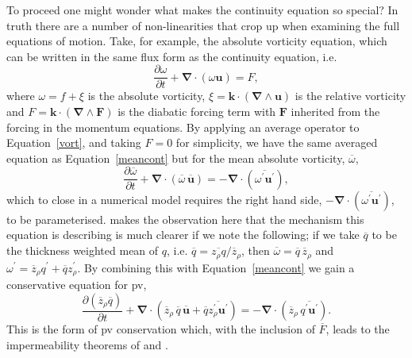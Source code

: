 \documentclass[12pt,a4paper]{report}
\newcommand*\mean[1]{\overline{#1}}
\newcommand*\res[1]{{#1}^{\prime}}
\newcommand*\equref[1]{Equation~\eqref{#1}}
\begin{document}
         To proceed one might wonder what makes the continuity equation
         so special? In truth there are a number of non-linearities that
         crop up when examining the full equations of motion. Take, for example, the
         absolute vorticity equation, which can be written in the same flux form as the continuity equation, i.e.
           \begin{equation}
           \frac{\partial \omega}{\partial t} + \boldsymbol{\nabla}\cdot\left(\omega\boldsymbol{u}\right) = F,
           \label{vort}
           \end{equation}
           where $\omega=f+\xi$ is the absolute vorticity,
           $\xi = \boldsymbol{k} \cdot\left( \boldsymbol{\nabla}\wedge \boldsymbol{u}\right)$ is the relative vorticity
           and $F =\boldsymbol{k} \cdot\left( \boldsymbol{\nabla}\wedge \boldsymbol{F}\right)$ is the diabatic forcing term with 
           $\boldsymbol{F}$ inherited
           from the forcing in the momentum equations. 
           By applying an average operator to \equref{vort}, and taking $F=0$ for
            simplicity, we have the same averaged equation as \equref{meancont} but for the
             mean absolute vorticity, $\mean{\omega}$,
                \begin{equation}
                \frac{\partial \mean{\omega}}{\partial t} + \boldsymbol{\nabla}\cdot\left(\mean{\omega} \, \mean{\boldsymbol{u}}\right) = - \boldsymbol{\nabla}\cdot\left(\mean{\res{\omega} \res{\boldsymbol{u}}}\right),
                \end{equation}
                which to close in a numerical model requires the
                right hand side, $- \boldsymbol{\nabla}\cdot\left(\mean{\res{\omega} \res{\boldsymbol{u}}}\right)$, to be parameterised.
                \cite{greatbatch1998exploring} makes the observation
                here that the mechanism this equation is describing 
                is much clearer if we note the following; if we take
                $\mean{q}$ to be the thickness weighted mean of $q$, i.e.
                $\mean{q}=\mean{z_{\rho}q}/\mean{z}_{\rho}$, then 
                $\mean{\omega}=\mean{q}\,\mean{z}_{\rho}$ and $\res{\omega}=\mean{z}_{\rho}\res{q}+\mean{q}\res{z}_{\rho}$. By 
                combining this with \equref{meancont} we gain a conservative equation 
                for \gls{pv}, 
                \begin{equation}
                \frac{\partial \left(\mean{z}_{\rho} \mean{q}\right)}{\partial t} +
                 \boldsymbol{\nabla}\cdot\left(\mean{z}_{\rho}\,\mean{q}\,\mean{\boldsymbol{u}}+\mean{q}\mean{\res{z}_{\rho} \res{\boldsymbol{u}}}\right)
                 = - \boldsymbol{\nabla}\cdot\left(\mean{z}_{\rho}\,\mean{\res{q} \res{\boldsymbol{u}}}\right) .
                 \label{meanpveq}
                \end{equation}
                This is the form of \gls{pv} conservation which, with the inclusion of
                $\mean{F}$, leads to the 
                impermeability theorems
                of \cite{haynes1987evolution} and \cite{haynes1990conservation}.
                
\end{document}
